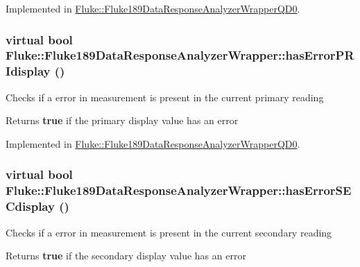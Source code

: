 Implemented in \hyperlink{classFluke_1_1Fluke189DataResponseAnalyzerWrapperQD0_af7a5731fbbd6ac2a7ab2a8d0a9f2ffe6}{Fluke::Fluke189DataResponseAnalyzerWrapperQD0}.\hypertarget{classFluke_1_1Fluke189DataResponseAnalyzerWrapper_a25ca42185c5573fb30a6c60e72c36e27}{
\subsubsection[{hasErrorPRIdisplay}]{\setlength{\rightskip}{0pt plus 5cm}virtual bool Fluke::Fluke189DataResponseAnalyzerWrapper::hasErrorPRIdisplay ()}}
\label{classFluke_1_1Fluke189DataResponseAnalyzerWrapper_a25ca42185c5573fb30a6c60e72c36e27}
Checks if a error in measurement is present in the current primary reading \begin{DoxyReturn}{Returns}
{\bfseries true} if the primary display value has an error 
\end{DoxyReturn}


Implemented in \hyperlink{classFluke_1_1Fluke189DataResponseAnalyzerWrapperQD0_a173f4602b71d7d415e11aa1f1826d3f0}{Fluke::Fluke189DataResponseAnalyzerWrapperQD0}.\hypertarget{classFluke_1_1Fluke189DataResponseAnalyzerWrapper_a99952a4552f0cb6705996b28312850dc}{
\subsubsection[{hasErrorSECdisplay}]{\setlength{\rightskip}{0pt plus 5cm}virtual bool Fluke::Fluke189DataResponseAnalyzerWrapper::hasErrorSECdisplay ()}}
\label{classFluke_1_1Fluke189DataResponseAnalyzerWrapper_a99952a4552f0cb6705996b28312850dc}
Checks if a error in measurement is present in the current secondary reading \begin{DoxyReturn}{Returns}
{\bfseries true} if the secondary display value has an error 
\end{DoxyReturn}


